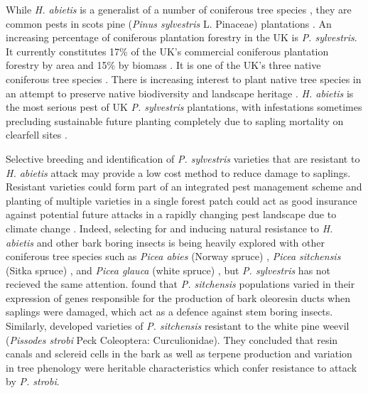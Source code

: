 \documentclass[a4paper, 11pt]{article}
\newcommand{\textapprox}{\raisebox{0.5ex}{\texttildelow}}
\begin{document}
While \textit{H. abietis} is a generalist of a number of coniferous tree species \citep{Wallertz2014, Toivonen2006}, they are common pests in scots pine (\textit{Pinus sylvestris} L. Pinaceae) plantations \citep{Manlove1997}. An increasing percentage of coniferous plantation forestry in the UK is \textit{P. sylvestris}. It currently constitutes \textapprox{}17\% of the UK's commercial coniferous plantation forestry by area and \textapprox{}15\% by biomass \citep{ForestryStatistics2018}. It is one of the UK's three native coniferous tree species \citep{Cheffings2005}. There is increasing interest to plant native tree species in an attempt to preserve native biodiversity and landscape heritage \citep{}. \textit{H. abietis} is the most serious pest of UK \textit{P. sylvestris} plantations, with infestations sometimes precluding sustainable future planting completely due to sapling mortality on clearfell sites \citep{Willoughby2017}.

Selective breeding and identification of \textit{P. sylvestris} varieties that are resistant to \textit{H. abietis} attack may provide a low cost method to reduce damage to saplings. Resistant varieties could form part of an integrated pest management scheme \citep{Telford2014} and planting of multiple varieties in a single forest patch could act as good insurance against potential future attacks in a rapidly changing pest landscape due to climate change \citep{Alfaro2014}. Indeed, selecting for and inducing natural resistance to \textit{H. abietis} and other bark boring insects is being heavily explored with other coniferous tree species such as \textit{Picea abies} (Norway spruce) \citep{Eyles2009, Schiebe2012}, \textit{Picea sitchensis} (Sitka spruce) \citep{King2011}, and \textit{Picea glauca} (white spruce) \citep{Kiss1991}, but \textit{P. sylvestris} has not recieved the same attention. \citet{Byun2006} found that \textit{P. sitchensis} populations varied in their expression of genes responsible for the production of bark oleoresin ducts when saplings were damaged, which act as a defence against stem boring insects. Similarly, \citet{Alfaro2013} developed varieties of \textit{P. sitchensis} resistant to the white pine weevil (\textit{Pissodes strobi} Peck Coleoptera: Curculionidae). They concluded that resin canals and sclereid cells in the bark as well as terpene production and variation in tree phenology were heritable characteristics which confer resistance to attack by \textit{P. strobi}.
\end{document}
